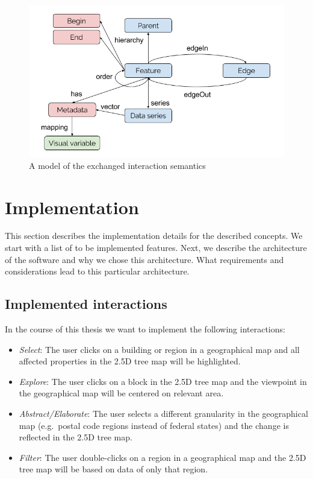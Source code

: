 \documentclass{article}
\newcommand{\tmap}{\textsc{2.5D} tree map}
\begin{document}
\begin{figure}[h!]
  \centering
  \includegraphics[width=\textwidth]{images/interaction-semantics.png}
  \caption{A model of the exchanged interaction semantics}
  \label{fig:implementation:interaction-semantics}
\end{figure}

\clearpage
\section{Implementation}

This section describes the implementation details for the described concepts.
We start with a list of to be implemented features.
Next, we describe the architecture of the software and why we chose this architecture.
What requirements and considerations lead to this particular architecture.


\subsection{Implemented interactions}

In the course of this thesis we want to implement the following interactions:
\begin{itemize}
  \item
    \emph{Select}: The user clicks on a building or region in a geographical map and all affected properties in the \tmap{} will be highlighted.
  \item
    \emph{Explore}: The user clicks on a block in the \tmap{} and the viewpoint in the geographical map will be centered on relevant area.
  \item
    \emph{Abstract/Elaborate}: The user selects a different granularity in the geographical map (e.g.\ postal code regions instead of federal states) and the change is reflected in the \tmap{}.
  \item
    \emph{Filter}: The user double-clicks on a region in a geographical map and the \tmap{} will be based on data of only that region.
\end{itemize}
\end{document}
